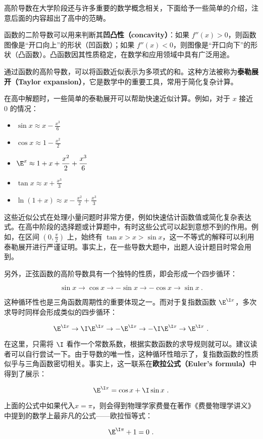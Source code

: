 高阶导数在大学阶段还与许多重要的数学概念相关，下面给予一些简单的介绍，注意后面的内容超出了高中的范畴。

函数的二阶导数可以用来判断其\textbf{凹凸性（concavity）}：如果 $f''(x) > 0$，则函数图像是“开口向上”的形状（凹函数）；如果 $f''(x) < 0$，则图像是“开口向下”的形状（凸函数）。凸函数因其性质稳定，在数学和应用领域中具有广泛用途。

通过函数的高阶导数，可以将函数近似表示为多项式的和。这种方法被称为\textbf{泰勒展开（Taylor expansion）}，它是数学中的重要工具，常用于简化复杂计算。

在高中解题时，一些简单的泰勒展开可以帮助快速近似计算。例如，对于 $x$ 接近 $0$ 的情况：
\begin{itemize}
\item $\displaystyle\sin x \approx x - \frac{x^3}{6}$
\item $\displaystyle\cos x \approx 1 - \frac{x^2}{2}$
\item $\displaystyle \E^x \approx 1 + x + \frac{x^2}{2} + \frac{x^3}{6}$
\item $\displaystyle\tan x \approx x + \frac{x^3}{3}$
\item $\displaystyle\ln (1 + x) \approx x - \frac{x^2}{2} + \frac{x^3}{3}$
\end{itemize}

这些近似公式在处理小量问题时非常方便，例如快速估计函数值或简化复杂表达式。在高中阶段的选择题或计算题中，有时这些公式可以起到意想不到的作用。例如，在区间 $(0, \frac{\pi}{2})$ 上，始终有 $\tan x > x > \sin x$，这一不等式的解释可以利用泰勒展开进行严谨证明。事实上，在一些导数大题中，出题人设计题目时常会用到。

另外，正弦函数的高阶导数具有一个独特的性质，即会形成一个四步循环：

\begin{equation}
\sin x \to \cos x \to -\sin x \to -\cos x \to \sin x~.
\end{equation}

这种循环性也是三角函数周期性的重要体现之一。而对于复指数函数 $\E^{\I x}$，多次求导时同样会形成类似的四步循环：

\begin{equation}
\E^{\I x} \to \I\E^{\I x} \to -\E^{\I x} \to -\I\E^{\I x} \to \E^{\I x}~.
\end{equation}

在这里，只需将 $\I$ 看作一个常数系数，根据实数函数的求导规则就可以。建议读者可以自行尝试一下。由于导数的唯一性，这种循环性暗示了，复指数函数的性质似乎与三角函数密切相关。事实上，这一联系在\textbf{欧拉公式（Euler’s formula）}中得到了展示：

\begin{equation}
\E^{\I x} = \cos x + \I\sin x~.
\end{equation}

上面的公式中如果代入$x=\pi$，则会得到物理学家费曼在著作《费曼物理学讲义》中提到的数学上最非凡的公式——欧拉恒等式：

\begin{equation}
\E^{\I \pi} + 1= 0~.
\end{equation}


